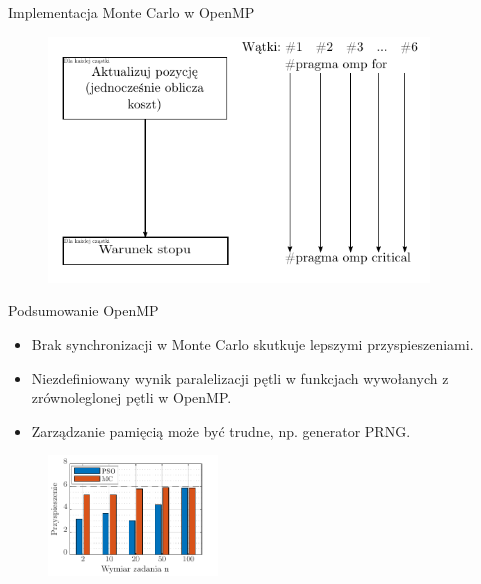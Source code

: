 \documentclass[handout]{beamer}
\begin{document}
\begin{frame}{Implementacja Monte Carlo w OpenMP}
\begin{figure}[t]
\includegraphics[width=0.9\textwidth]{grafiki/alg_OpenMP_MC.pdf}
\end{figure}
\end{frame}

\begin{frame}{Podsumowanie OpenMP}
\begin{itemize}
\item Brak synchronizacji w Monte Carlo skutkuje lepszymi przyspieszeniami.
\item Niezdefiniowany wynik paralelizacji pętli w funkcjach wywołanych z zrównoleglonej pętli w OpenMP.
\item Zarządzanie pamięcią może być trudne, np. generator PRNG.
\end{itemize}
\begin{figure}[h]
\includegraphics[width=0.4\textwidth]{grafiki/tabela_zad1_przyspieszenie.pdf}
\end{figure}
\end{frame}
\end{document}
